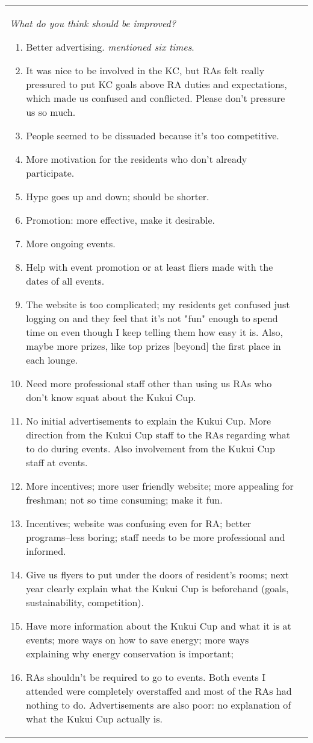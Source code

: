 \documentclass[]{article}
\begin{document}
\begin{figure*}[th!]
\begin{tabular}{|l|l|}
\small  \begin{minipage}[t]{4.0in}
{\em What do you think should be improved?}
\begin{enumerate}
\item 	Better advertising. {\em mentioned six times}.
\item It was nice to be involved in the KC, but RAs felt really pressured to put KC goals above RA duties and expectations, which made us confused and conflicted.  Please don't pressure us so much.
\item People seemed to be dissuaded because it's too competitive.
\item More motivation for the residents who don't already participate.
\item Hype goes up and down; should be shorter.
\item Promotion: more effective, make it desirable.
\item More ongoing events.
\item Help with event promotion or at least fliers made with the dates of all events.
\item The website is too complicated; my residents get confused just logging on and they feel that it's not "fun" enough to spend time on even though I keep telling them how easy it is.  Also, maybe more prizes, like top prizes [beyond] the first place in each lounge.
\item Need more professional staff other than using us RAs who don't know squat about the Kukui Cup.
\item 	No initial advertisements to explain the Kukui Cup. More direction from the Kukui Cup staff to the RAs regarding what to do during events. Also involvement from the Kukui Cup staff at events. 
\item 	More incentives; more user friendly website; more appealing for freshman; not so time consuming; make it fun.
\item 	Incentives; website was confusing even for RA; better programs--less boring; staff needs to be more professional and informed.
\item 	Give us flyers to put under the doors of resident's rooms; next year clearly explain what the Kukui Cup is beforehand (goals, sustainability, competition).
\item 	Have more information about the Kukui Cup and what it is at events; more ways on how to save energy; more ways explaining why energy conservation is important;
\item 	RAs shouldn't be required to go to events.  Both events I attended were completely overstaffed and most of the RAs had nothing to do.   Advertisements are also poor: no explanation of what the Kukui Cup actually is.

\end{enumerate}
\end{minipage}
\end{tabular}
\end{figure*}
\end{document}
